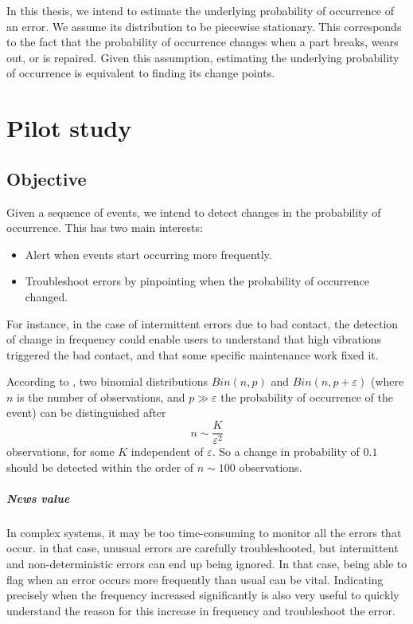 \documentclass{kththesis}
\begin{document}
In this thesis, we intend to estimate the underlying probability of occurrence of an error.
We assume its distribution to be piecewise
stationary. This corresponds to the fact that the probability of
occurrence changes when a part breaks, wears out, or is repaired. Given this assumption, estimating the underlying probability of occurrence is
equivalent to finding its change points.

\clearpage

\chapter{Pilot study}

\section{Objective}

Given a sequence of events, we intend to detect changes in the probability of occurrence. This has two main interests:

\begin{itemize}
\item Alert when events start occurring more frequently.
\item Troubleshoot errors by pinpointing when the probability of occurrence changed.
\end{itemize}

For instance, in the case of intermittent errors due to bad contact, the detection of change in frequency could enable users to understand that high vibrations triggered the bad contact, and that some specific maintenance work fixed it.

According to \parencite{baigneres2004}, two binomial distributions $Bin(n, p)$ and $Bin(n, p+\varepsilon)$ (where $n$ is the number of observations, and $p \gg \varepsilon$ the probability of occurrence of the event) can be distinguished after 
$$n \sim \dfrac{K}{\varepsilon^2}$$
observations, for some $K$ independent of $\varepsilon$.
So a change in probability of $0.1$ should be detected within the order of $n \sim 100$ observations.


\paragraph{News value}

In complex systems, it may be too time-consuming to monitor all the errors that occur. in that case, unusual errors are carefully troubleshooted, but intermittent and non-deterministic errors can end up being ignored. In that case, being able to flag when an error occurs more frequently than usual can be vital. Indicating precisely when the frequency increased significantly is also very useful to quickly understand the reason for this increase in frequency and troubleshoot the error.
\end{document}
